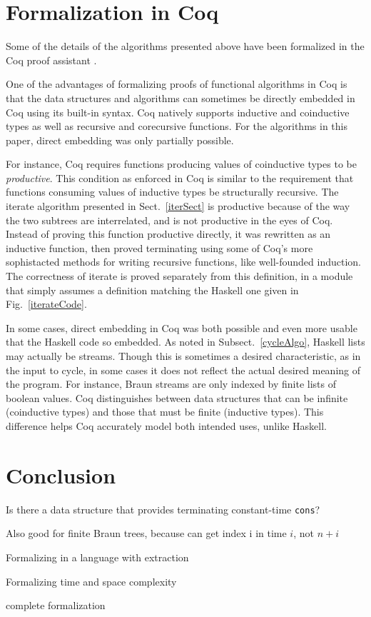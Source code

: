 \documentclass[envcountsect]{llncs}
\begin{document}
\section{Formalization in Coq}

Some of the details of the algorithms presented above have been formalized in the Coq proof assistant \cite{coq,website}.

One of the advantages of formalizing proofs of functional algorithms in Coq is that the data structures and algorithms can sometimes be directly embedded in Coq using its built-in syntax.
Coq natively supports inductive and coinductive types as well as recursive  and corecursive functions.
For the algorithms in this paper, direct embedding was only partially possible.

For instance, Coq requires functions producing values of coinductive types to be {\em productive}.
This condition as enforced in Coq is similar to the requirement that functions consuming values of inductive types be structurally recursive.
The iterate algorithm presented in Sect.~\ref{iterSect} is productive because of the way the two subtrees are interrelated, and is not productive in the eyes of Coq.
Instead of proving this function productive directly, it was rewritten as an inductive function, then proved terminating using some of Coq's more sophistacted methods for writing recursive functions, like well-founded induction.
The correctness of iterate is proved separately from this definition, in a module that simply assumes a definition matching the Haskell one given in Fig.~\ref{iterateCode}.

In some cases, direct embedding in Coq was both possible and even more usable that the Haskell code so embedded.
As noted in Subsect.~\ref{cycleAlgo}, Haskell lists may actually be streams.
Though this is sometimes a desired characteristic, as in the input to cycle, in some cases it does not reflect the actual desired meaning of the program.
For instance, Braun streams are only indexed by finite lists of boolean values.
Coq distinguishes between data structures that can be infinite (coinductive types) and those that must be finite (inductive types).
This difference helps Coq accurately model both intended uses, unlike Haskell.

\begin{comment}
how many lines?
how many generated lines?
hiccups:
* subtraction
* repeated function application not built-in (show equal to another formulation)
\end{comment}

\section{Conclusion}

Is there a data structure that provides terminating constant-time \verb|cons|?

Also good for finite Braun trees, because can get index i in time $i$, not $n+i$

Formalizing in a language with extraction

Formalizing time and space complexity

complete formalization



\end{document}
